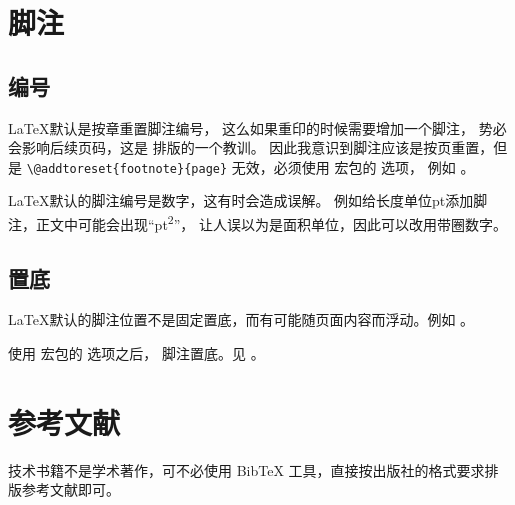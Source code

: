 \section{脚注} %

\subsection{编号}
\LaTeX 默认是按章重置脚注编号，
这么如果重印的时候需要增加一个脚注，
势必会影响后续页码，这是 \mybooktitle 排版的一个教训。
因此我意识到脚注应该是按页重置，但是 \verb|\@addtoreset{footnote}{page}|
无效，必须使用  宏包的  选项，
例如 。

\LaTeX 默认的脚注编号是数字，这有时会造成误解。
例如给长度单位pt添加脚注，正文中可能会出现“pt\textsuperscript{2}”，
让人误以为是面积单位，因此可以改用带圈数字。

\subsection{置底}
\LaTeX 默认的脚注位置不是固定置底，而有可能随页面内容而浮动。例如 。

\vspace{1ex}
\centerline{%
\quad{}}

使用  宏包的  选项之后，
脚注置底。见 。 \nopagebreak

\vspace{1ex}
\centerline{%
\quad{}}

\section{参考文献}
技术书籍不是学术著作，可不必使用 BibTeX 工具，直接按出版社的格式要求排版参考文献即可。
